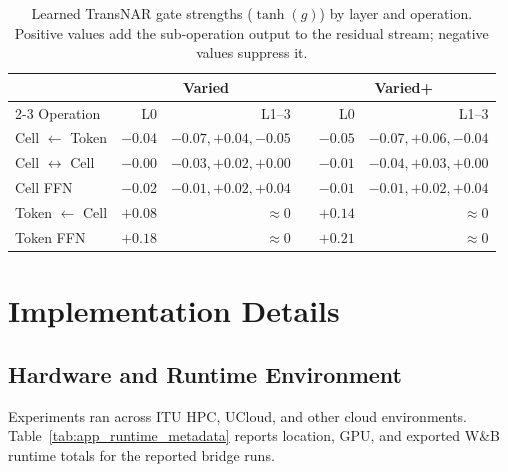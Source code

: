 \documentclass[11pt]{article}
\begin{document}
\begin{table}[t]
\centering
\small
\caption{Learned TransNAR gate strengths ($\tanh(g)$) by layer and operation. Positive values add the sub-operation output to the residual stream; negative values suppress it.}
\label{tab:gate_full}
\begin{tabular}{lrrrrr}
\toprule
 & \multicolumn{2}{c}{Varied} & & \multicolumn{2}{c}{Varied+} \\
\cmidrule{2-3}\cmidrule{5-6}
Operation & L0 & L1--3 & & L0 & L1--3 \\
\midrule
Cell $\leftarrow$ Token & $-0.04$ & $-0.07,+0.04,-0.05$ & & $-0.05$ & $-0.07,+0.06,-0.04$ \\
Cell $\leftrightarrow$ Cell & $-0.00$ & $-0.03,+0.02,+0.00$ & & $-0.01$ & $-0.04,+0.03,+0.00$ \\
Cell FFN & $-0.02$ & $-0.01,+0.02,+0.04$ & & $-0.01$ & $-0.01,+0.02,+0.04$ \\
Token $\leftarrow$ Cell & $\mathbf{+0.08}$ & $\approx 0$ & & $\mathbf{+0.14}$ & $\approx 0$ \\
Token FFN & $\mathbf{+0.18}$ & $\approx 0$ & & $\mathbf{+0.21}$ & $\approx 0$ \\
\bottomrule
\end{tabular}
\end{table}

\clearpage

\section{Implementation Details}
\label{app:implementation_details}

\subsection{Hardware and Runtime Environment}
\label{app:hardware_runtime}

Experiments ran across ITU HPC, UCloud, and other cloud environments.
Table~\ref{tab:app_runtime_metadata} reports location, GPU, and exported W\&B runtime totals for the reported bridge runs.
\end{document}
